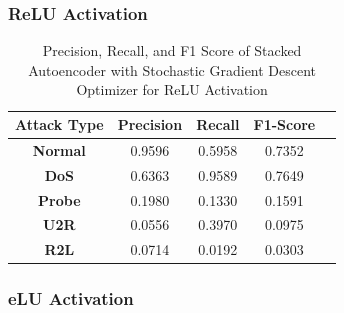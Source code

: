 \documentclass[12pt, a4paper]{report}
\begin{document}
\subsubsection{ReLU Activation}
\begin{table}[ht]
\centering
\captionsetup{justification=centering,margin=2cm}
\begin{tabular}{|c|c|c|c|c|}
\hline
\multicolumn{1}{|c|}{\textbf{Attack Type}} & \multicolumn{1}{c|}{\textbf{Precision}} & \multicolumn{1}{c|}{\textbf{Recall}} & \multicolumn{1}{c|}{\textbf{F1-Score}} \\ \hline
\textbf{Normal}        & 0.9596                                   & 0.5958                                & 0.7352                                                                  \\ \hline
\textbf{DoS}           & 0.6363                                  & 0.9589                                &  0.7649                                                                    \\ \hline
\textbf{Probe}         & 0.1980                                  & 0.1330                                & 0.1591                                                                  \\ \hline
\textbf{U2R}           & 0.0556                                    & 0.3970                                & 0.0975                                                                   \\ \hline
\textbf{R2L}           & 0.0714                                      & 0.0192                                   & 0.0303                                                            \\ \hline         \end{tabular}
\caption{Precision, Recall, and F1 Score of Stacked Autoencoder with Stochastic Gradient Descent Optimizer for ReLU Activation}
\label{prf1_sgd_relu_auto}
\end{table}
\clearpage
\subsubsection{eLU Activation}
\end{document}

